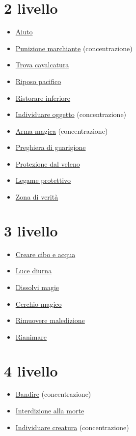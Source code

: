 \documentclass[a4paper,10pt,twoside,twocolumn,openany,bg=full,nodeprecatedcode]{dndbook}
\begin{document}
\section{2\degree{} livello}\label{2_livello}
\begin{itemize}
  \item \hyperref[Aid_aid]{Aiuto}
  \item \hyperref[Branding_Smite_branding_smite]{Punizione marchiante} (concentrazione)
  \item \hyperref[Find_Steed_find_steed]{Trova cavalcatura}
  \item \hyperref[Gentle_Repose_gentle_repose]{Riposo pacifico}
  \item \hyperref[Lesser_Restoration_lesser_restoration]{Ristorare inferiore}
  \item \hyperref[Locate_Object_locate_object]{Individuare oggetto} (concentrazione)
  \item \hyperref[Magic_Weapon_magic_weapon]{Arma magica} (concentrazione)
  \item \hyperref[Prayer_of_Healing_prayer_of_healing]{Preghiera di guarigione}
  \item \hyperref[Protection_from_Poison_protection_from_poison]{Protezione dal veleno}
  \item \hyperref[Warding_Bond_warding_bond]{Legame protettivo}
  \item \hyperref[Zone_of_Truth_zone_of_truth]{Zona di verità}
\end{itemize}

\section{3\degree{} livello}\label{3_livello}
\begin{itemize}
  \item \hyperref[Create_Food_and_Water_create_food_and_water]{Creare cibo e acqua}
  \item \hyperref[Daylight_daylight]{Luce diurna}
  \item \hyperref[Dispel_Magic_dispel_magic]{Dissolvi magie}
  \item \hyperref[Magic_Circle_magic_circle]{Cerchio magico}
  \item \hyperref[Remove_Curse_remove_curse]{Rimuovere maledizione}
  \item \hyperref[Revivify_revivify]{Rianimare}
\end{itemize}

\section{4\degree{} livello}\label{4_livello}
\begin{itemize}
  \item \hyperref[Banishment_banishment]{Bandire} (concentrazione)
  \item \hyperref[Death_Ward_death_ward]{Interdizione alla morte}
  \item \hyperref[Locate_Creature_locate_creature]{Individuare creatura} (concentrazione)
\end{itemize}
\end{document}

